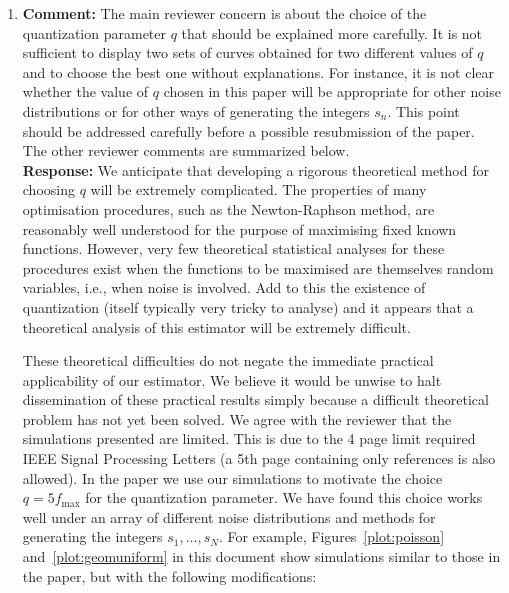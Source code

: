 \documentclass[a4paper,10pt]{article}
\begin{document}
\begin{enumerate}
\item\textbf{Comment:}
The main reviewer concern is about the choice of the quantization parameter
$q$ that should be explained more carefully. It is not sufficient to display two sets
of curves obtained for two different values of $q$ and to choose the best one without
explanations. For instance, it is not clear whether the value of $q$ chosen in this paper
will be appropriate for other noise distributions or for other ways of generating the
integers $s_n$. This point should be addressed carefully before a possible resubmission
of the paper. The other reviewer comments are summarized below.
\\
\textbf{Response:}
We anticipate that developing a rigorous theoretical method for choosing $q$ will be extremely complicated.  The properties of many optimisation procedures, such as the Newton-Raphson method, are reasonably well understood for the purpose of maximising fixed known functions. However, very few theoretical statistical analyses for these procedures exist when the functions to be maximised are themselves random variables, i.e., when noise is involved.  Add to this the existence of quantization (itself typically very tricky to analyse) and it appears that a theoretical analysis of this estimator will be extremely difficult.

These theoretical difficulties do not negate the immediate practical applicability of our estimator.  We believe it would be unwise to halt dissemination of these practical results simply because a difficult theoretical problem has not yet been solved.  We agree with the reviewer that the simulations presented are limited. This is due to the 4 page limit required IEEE Signal Processing Letters (a 5th page containing only references is also allowed).  In the paper we use our simulations to motivate the choice $q = 5 f_{\text{max}}$ for the quantization parameter.  We have found this choice works well under an array of different noise distributions and methods for generating the integers $s_1,\dots,s_N$.  For example, Figures~\ref{plot:poisson} and~\ref{plot:geomuniform} in this document show simulations similar to those in the paper, but with the following modifications:


\end{enumerate}
\end{document}
